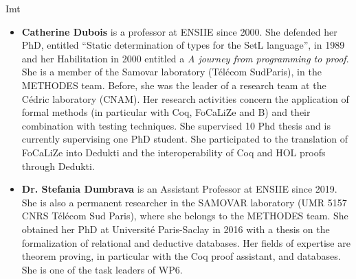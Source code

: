 \begin{sitedescription}{Imt}
\begin{itemize}
\item {\bf Catherine Dubois} is a professor at ENSIIE since 2000. She defended her PhD, entitled “Static determination of types for the SetL language”, in 1989 and her Habilitation in 2000 entitled a
\emph{A journey from programming to proof}. She is a 
member of the Samovar laboratory (T\'el\'ecom
SudParis), in the METHODES team. Before, she was the leader of a research team at the Cédric laboratory (CNAM). Her research activities concern the application of formal methods (in particular with Coq, FoCaLiZe and B) and their combination with testing techniques. She supervised 10 Phd thesis and is currently supervising one PhD student. She participated to the translation of FoCaLiZe into Dedukti and the interoperability of Coq and HOL proofs through Dedukti.

\item{\bf Dr. Stefania Dumbrava}
is an Assistant Professor at ENSIIE since 2019. She is also a permanent researcher in the SAMOVAR laboratory (UMR 5157 CNRS Télécom
Sud Paris), where she belongs to the METHODES team. She obtained her PhD at Université Paris-Saclay in 2016 with a thesis on the formalization 
of relational and deductive databases. Her fields of expertise are theorem proving, in particular with the Coq proof assistant, and databases. 
She is one of the task leaders of WP6. 
\end{itemize}


\end{sitedescription}

